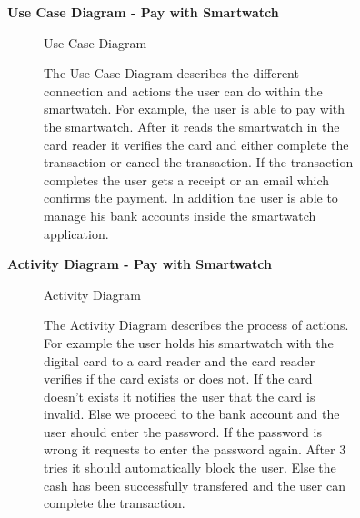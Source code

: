 \documentclass{article}
\begin{document}
	\begin{figure}[htbp]
		\textbf{Use Case Diagram - Pay with Smartwatch}
		\centering
		\begin{subfigure}{\textwidth}
			\resizebox{\textwidth}{!}{}
			\caption{Use Case Diagram}
		\end{subfigure}
		\begin{subfigure}{\textwidth}
			The Use Case Diagram describes the different connection and actions the user can do within the smartwatch. For example, 
			the user is able to pay with the smartwatch. After it reads the smartwatch in the card reader it verifies the card and 
			either complete the transaction or cancel the transaction. If the transaction completes the user gets a receipt or an 
			email which confirms the payment. In addition the user is able to manage his bank accounts inside the smartwatch application. 
		\end{subfigure}
	\end{figure}
	\clearpage

	\begin{figure}[htbp]
		\textbf{Activity Diagram - Pay with Smartwatch}
		\centering
		\begin{subfigure}{\textwidth}
			\resizebox{\textwidth}{!}{}
			\caption{Activity Diagram}
		\end{subfigure}
		\begin{subfigure}{\textwidth}
			The Activity Diagram describes the process of actions. For example the user holds his smartwatch with the digital card
			to a card reader and the card reader verifies if the card exists or does not. If the card doesn't exists it notifies
			the user that the card is invalid. Else we proceed to the bank account and the user should enter the password. If the 
			password is wrong it requests to enter the password again. After 3 tries it should automatically block the user. Else the 
			cash has been successfully transfered and the user can complete the transaction. 
		\end{subfigure}
	\end{figure}
	\clearpage
\end{document}

